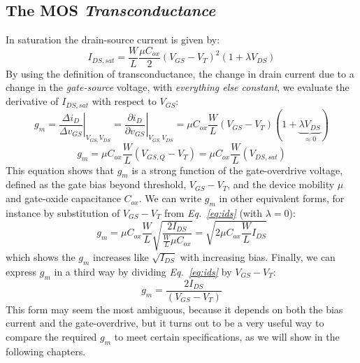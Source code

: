 \subsection{The MOS \textit{Transconductance}}
In saturation the drain-source current is given by:
    \begin{equation}
        {I_{DS,sat}} = \frac{W}{L}\frac{{\mu {C_{ox}}}}{2}{({V_{GS}} - {V_T})^2}(1 + \lambda {V_{DS}})
        \label{eq:ids}
    \end{equation} 
By using the definition of transconductance, the change in drain current due to a change in the \textit{gate-source} voltage, with \textit{everything else constant}, we evaluate the derivative of $I_{DS,sat}$ with respect to $V_{GS}$:
    \begin{equation}
        {g_m} = {\left. {\frac{{\Delta {i_D}}}{{\Delta {v_{GS}}}}} \right|_{{V_{GS,}}{V_{DS}}}} = {\left. {\frac{{\partial {i_D}}}{{\partial {v_{GS}}}}} \right|_{{V_{GS,}}{V_{DS}}}} = \mu {C_{ox}}\frac{W}{L}({V_{GS}} - {V_T})(1 +\underbrace{ \lambda {V_{DS}}}_{\approx 0})
    \end{equation}
    \begin{equation}
        {g_m} = \mu {C_{ox}}\frac{W}{L}({V_{GS,Q}} - {V_T}) = \mu {C_{ox}}\frac{W}{L}(V_{DS,sat})
    \end{equation}
This equation shows that $g_m$ is a strong function of the gate-overdrive voltage, defined as the gate bias beyond threshold, $V_{GS} - V_T$, and the device mobility $\mu$ and gate-oxide capacitance $C_{ox}$.  We can write $g_m$ in other equivalent forms, for instance by substitution of $V_{GS}-V_T$ from \emph{Eq.~\ref{eq:ids}} (with $\lambda = 0$):
    \begin{equation}
        {g_m} = \mu {C_{ox}}\frac{W}{L}\sqrt {\frac{{2{I_{DS}}}}{{\frac{W}{L}\mu {C_{ox}}}}}  = \sqrt {2\mu{C_{ox}}\frac{W}{L}{I_{DS}}}
    \end{equation}
which shows the $g_m$ increases like $\sqrt{I_{DS}}$ with increasing bias.  Finally, we can express $g_m$ in a third way by dividing \emph{Eq.~\ref{eq:ids}} by $V_{GS}-V_T$:
    \begin{equation}
        {g_m} = \frac{{2{I_{DS}}}}{{({V_{GS}} - {V_T})}} \label{eq:gm_vstar}
    \end{equation} 
This form may seem the most ambiguous, because it depends on both the bias current and the gate-overdrive, but it turns out to be a very useful way to compare the required $g_m$ to meet certain specifications, as we will show in the following chapters.
